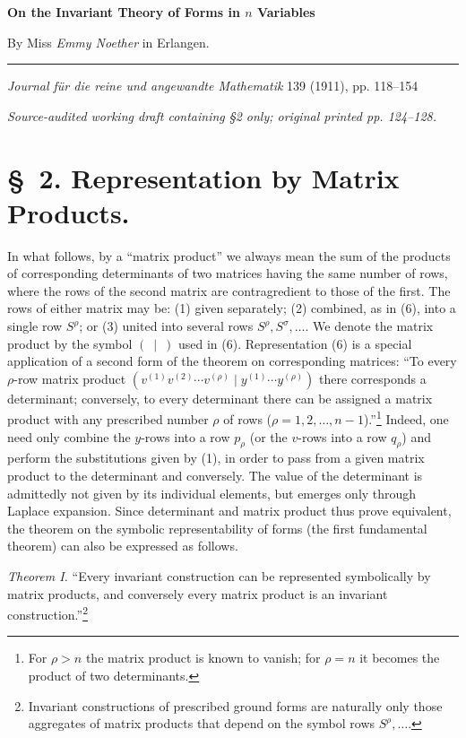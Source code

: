 \documentclass[10pt]{article}
\newcommand{\pair}[2]{(#1\mid #2)}
\begin{document}
\begin{center}
{\Large\bfseries On the Invariant Theory of Forms in $n$ Variables}\par
\vspace{0.5em}By Miss \emph{Emmy Noether} in Erlangen.\par
\medskip\rule{0.22\linewidth}{0.4pt}\par\vspace{0.7em}
\emph{Journal f\"ur die reine und angewandte Mathematik} 139 (1911), pp. 118--154\par\smallskip
{\small\itshape Source-audited working draft containing \S2 only; original printed pp. 124--128.}
\end{center}

\section*{\S\ 2. Representation by Matrix Products.}

In what follows, by a ``matrix product'' we always mean the sum of the products of corresponding determinants of two matrices having the same number of rows, where the rows of the second matrix are contragredient to those of the first. The rows of either matrix may be: (1) given separately; (2) combined, as in (6), into a single row $S^\rho$; or (3) united into several rows $S^\rho,S^\sigma,\ldots$. We denote the matrix product by the symbol $(\ \mid\ )$ used in (6). Representation (6) is a special application of a second form of the theorem on corresponding matrices: ``To every $\rho$-row matrix product $\pair{v^{(1)}v^{(2)}\cdots v^{(\rho)}}{y^{(1)}\cdots y^{(\rho)}}$ there corresponds a determinant; conversely, to every determinant there can be assigned a matrix product with any prescribed number $\rho$ of rows ($\rho=1,2,\ldots,n-1$).''\footnote{For $\rho>n$ the matrix product is known to vanish; for $\rho=n$ it becomes the product of two determinants.} Indeed, one need only combine the $y$-rows into a row $p_\rho$ (or the $v$-rows into a row $q_\rho$) and perform the substitutions given by (1), in order to pass from a given matrix product to the determinant and conversely. The value of the determinant is admittedly not given by its individual elements, but emerges only through Laplace expansion. Since determinant and matrix product thus prove equivalent, the theorem on the symbolic representability of forms (the first fundamental theorem) can also be expressed as follows.

\emph{Theorem I.} ``Every invariant construction can be represented symbolically by matrix products, and conversely every matrix product is an invariant construction.''\footnote{Invariant constructions of prescribed ground forms are naturally only those aggregates of matrix products that depend on the symbol rows $S^\rho,\ldots$.}
\end{document}
